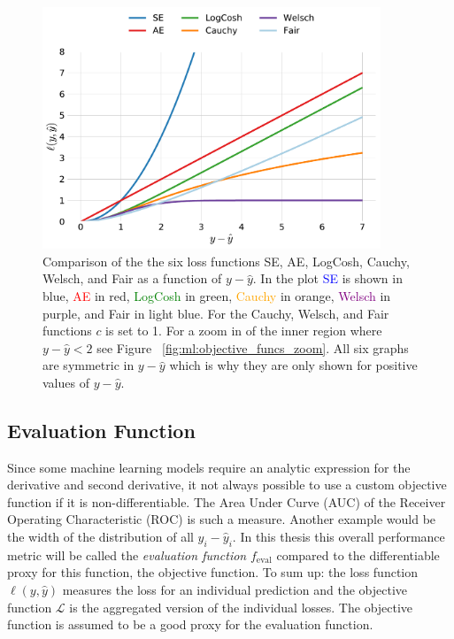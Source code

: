 \documentclass[a4paper, twoside, nobib]{tufte-book}
\newcommand{\figref}[1]{Figure ~\ref{#1}}
\begin{document}
\begin{figure}
  \includegraphics[width=0.9\textwidth]{figures/objective_functions/objective_functions.pdf}
  \caption[Comparison of different objective functions.]
    {Comparison of the the six loss functions SE, AE, LogCosh, Cauchy, Welsch, and Fair as a function of $y-\hat{y}$. In the plot \textcolor{blue}{SE} is shown in blue, \textcolor{red}{AE} in red, \textcolor{green}{LogCosh} in green, \textcolor{orange}{Cauchy} in orange, \textcolor{purple}{Welsch} in purple, and \textcolor{light-blue}{Fair} in light blue. For the Cauchy, Welsch, and Fair functions $c$ is set to 1. For a zoom in of the inner region 
    where $y-\hat{y}<2$ see \figref{fig:ml:objective_funcs_zoom}. All six graphs are symmetric in $y-\hat{y}$ which is why they are only shown for positive values of $y-\hat{y}$.
    }
  \label{fig:ml:objective_funcs}
\end{figure}

\subsection{Evaluation Function}
Since some machine learning models require an analytic expression for the derivative and second derivative, it not always possible to use a custom objective function if it is non-differentiable. The Area Under Curve (AUC) of the Receiver Operating Characteristic (ROC) is such a measure. Another example would be the width of the distribution of all $y_i-\hat{y}_i$. In this thesis this overall performance metric will be called the \emph{evaluation function} $f_\mathrm{eval}$ compared to the differentiable proxy for this function, the objective function. To sum up: the loss function $\ell(y, \hat{y})$ measures the loss for an individual prediction and the objective function $\mathcal{L}$ is the aggregated version of the individual losses. The objective function is assumed to be a good proxy for the evaluation function. 
\end{document}
